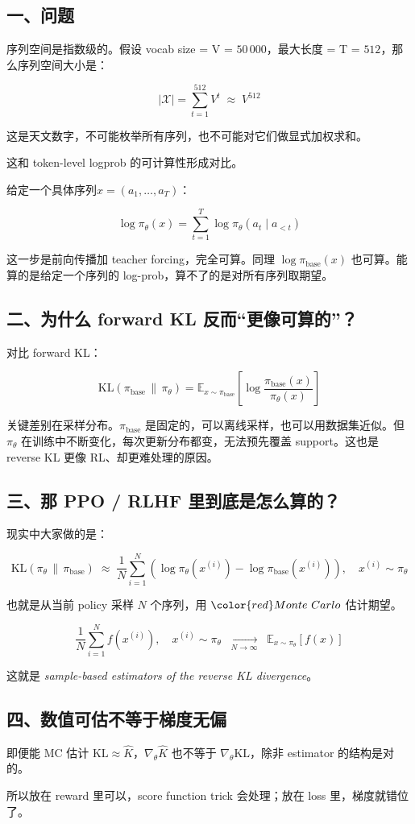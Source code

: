 \subsection{一、问题}

序列空间是指数级的。假设 vocab size = V = \(50\,000\)，最大长度 = T = \(512\)，那么序列空间大小是：

\[
|\mathcal{X}| = \sum_{t=1}^{512} V^t \;\approx\; V^{512}
\]

这是天文数字，不可能枚举所有序列，也不可能对它们做显式加权求和。

这和 token-level logprob 的可计算性形成对比。

给定一个具体序列\(x = (a_1,\dots,a_T)\)：

\[
\log \pi_\theta(x) = \sum_{t=1}^T \log \pi_\theta(a_t \mid a_{<t})
\]

这一步是前向传播加 teacher forcing，完全可算。同理 \(\log \pi_{\text{base}}(x)\) 也可算。能算的是给定一个序列的 log-prob，算不了的是对所有序列取期望。

\subsection{二、为什么 forward KL 反而“更像可算的”？}

对比 forward KL：

\[
\mathrm{KL}(\pi_{\text{base}} \,\|\, \pi_\theta) = \mathbb{E}_{x \sim \pi_{\text{base}}} \left[ \log \frac{\pi_{\text{base}}(x)}{\pi_\theta(x)} \right]
\]

关键差别在采样分布。\(\pi_{\text{base}}\) 是固定的，可以离线采样，也可以用数据集近似。但 \(\pi_\theta\) 在训练中不断变化，每次更新分布都变，无法预先覆盖 support。这也是 reverse KL 更像 RL、却更难处理的原因。

\subsection{三、那 PPO / RLHF 里到底是怎么算的？}

现实中大家做的是：

\[
\mathrm{KL}(\pi_\theta \,\|\, \pi_{\text{base}}) \;\approx\; \frac{1}{N} \sum_{i=1}^N \left( \log \pi_\theta(x^{(i)}) - \log \pi_{\text{base}}(x^{(i)}) \right), \quad x^{(i)} \sim \pi_\theta
\]

也就是从当前 policy 采样 \(N\) 个序列，用 \(\color{red}Monte\ Carlo\) 估计期望。

\[
\frac{1}{N}\sum_{i=1}^N f(x^{(i)}),
\quad x^{(i)} \sim \pi_\theta
\;\;\xrightarrow[N\to\infty]{}\;\;
\mathbb{E}_{x\sim\pi_\theta}[f(x)]
\]

这就是 \emph{sample-based estimators of the reverse KL divergence}。

\subsection{四、数值可估不等于梯度无偏}

即便能 MC 估计 \(\mathrm{KL} \approx \hat{K}\)，\(\nabla_\theta \hat{K}\) 也不等于 \(\nabla_\theta \mathrm{KL}\)，除非 estimator 的结构是对的。

所以放在 reward 里可以，score function trick 会处理；放在 loss 里，梯度就错位了。
